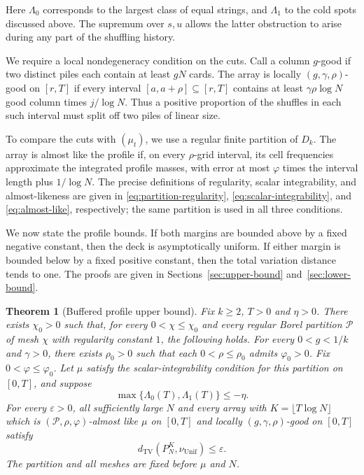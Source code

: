 \documentclass[11pt]{article}
\numberwithin{equation}{section}
\newtheorem{theorem}{Theorem}[section]
\theoremstyle{definition}
\theoremstyle{remark}
\newcommand{\TV}{\mathrm{TV}}
\newcommand{\Unif}{\mathrm{Unif}}
\newcommand{\dTV}{d_{\TV}}
\newcommand{\nuUnif}{\nu_{\Unif}}
\newcommand{\1}{\mathbf 1}
\begin{document}
Here $\Lambda_0$ corresponds to the largest class of equal strings, and
$\Lambda_1$ to the cold spots discussed above. The supremum over $s,u$
allows the latter obstruction to arise during any part of the shuffling
history.

We require a local nondegeneracy condition on the cuts. Call a column
$g$-good if two distinct piles each contain at least $gN$ cards. The
array is locally $(g,\gamma,\rho)$-good on $[r,T]$ if every interval
$[a,a+\rho]\subseteq[r,T]$ contains at least $\gamma\rho\log N$ good
column times $j/\log N$. Thus a positive proportion of the shuffles
in each such interval must split off two piles of linear size.

To compare the cuts with $(\mu_t)$, we use a regular finite partition
of $D_k$. The array is almost like the profile if, on every
$\rho$-grid interval, its cell frequencies approximate the integrated
profile masses, with error at most $\varphi$ times the interval length
plus $1/\log N$. The precise definitions of regularity, scalar
integrability, and almost-likeness are given in
\eqref{eq:partition-regularity}, \eqref{eq:scalar-integrability}, and
\eqref{eq:almost-like}, respectively; the same partition is used in
all three conditions.

We now state the profile bounds. If both margins are bounded above by a
fixed negative constant, then the deck is asymptotically uniform. If
either margin is bounded below by a fixed positive constant, then the
total variation distance tends to one. The proofs are given in
Sections~\ref{sec:upper-bound} and~\ref{sec:lower-bound}.

\begin{theorem}[Buffered profile upper bound]%
\label{thm:upper-profile}
Fix $k\ge2$, $T>0$ and $\eta>0$. There exists $\chi_0>0$ such that,
for every $0<\chi\le\chi_0$ and every regular Borel partition $\mathcal P$ of
mesh $\chi$ with regularity constant $1$, the following holds.
For every $0<g<1/k$ and $\gamma>0$, there exists $\rho_0>0$ such
that each $0<\rho\le\rho_0$ admits $\varphi_0>0$. Fix
$0<\varphi\le\varphi_0$. Let $\mu$ satisfy the scalar-integrability
condition for this partition on $[0,T]$, and suppose
\[
 \max\{\Lambda_0(T),\Lambda_1(T)\}\le-\eta.
\]
For every $\varepsilon>0$, all sufficiently large $N$ and every array
with $K=\lfloor T\log N\rfloor$ which is
$(\mathcal P,\rho,\varphi)$-almost like $\mu$ on $[0,T]$ and locally
$(g,\gamma,\rho)$-good on $[0,T]$ satisfy
\[
 \dTV(P_N^K,\nuUnif)\le\varepsilon.
\]
The partition and all meshes are fixed before $\mu$ and $N$.
\end{theorem}
\end{document}
